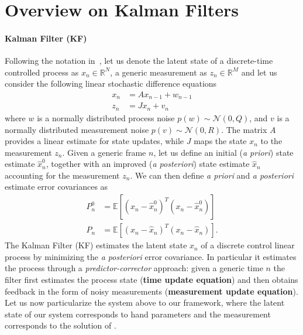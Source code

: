 \appendix

\section{Overview on Kalman Filters}

\paragraph{Kalman Filter (KF)} 
Following the notation in~\cite{welch1995introduction}, let us denote the latent state of a discrete-time controlled process as $x_n \in \mathbb{R}^N$, a generic measurement as $z_n \in \mathbb{R}^M$ and let us consider the following linear stochastic difference equations
% 
\begin{align}
x_n &= A x_{n - 1} +  w_{n - 1} \\
z_n &= J x_n + v_n
\end{align}
% 
where $w$ is a normally distributed process noise $p(w) \sim \mathcal{N}(0, Q)$, and $v$ is a normally distributed measurement noise $p(v) \sim \mathcal{N}(0, R)$. The matrix $A$ provides a linear estimate for state updates, while $J$ maps the state $x_n$ to the measurement $z_n$.
Given a generic frame $n$, let us define an initial (\textit{a priori}) state estimate $\hat{x}_n^0$, together with an improved (\textit{a posteriori}) state estimate $\hat{x}_n$ accounting for the measurement $z_n$. 
We can then define \textit{a priori} and \textit{a posteriori} estimate error covariances as
% 
\begin{align}
	P_n^0 &= \mathbb{E}[(x_n - \hat{x}_n^0)^T(x_n - \hat{x}_n^0)]\\
	P_n   &= \mathbb{E}[(x_n - \hat{x}_n)^T(x_n - \hat{x}_n)].
\end{align}
%
The Kalman Filter (KF) estimates the latent state $x_n$ of a discrete control linear process by minimizing the \textit{a posteriori} error covariance. In particular it estimates the process through a \textit{predictor-corrector} approach: given a generic time $n$ the filter first estimates the process state (\textbf{time update equation}) and then obtains feedback in the form of noisy measurements (\textbf{measurement update equation}).
Let us now particularize the system above to our framework, where the latent state of our system corresponds to hand parameters and the measurement corresponds to the solution of .
